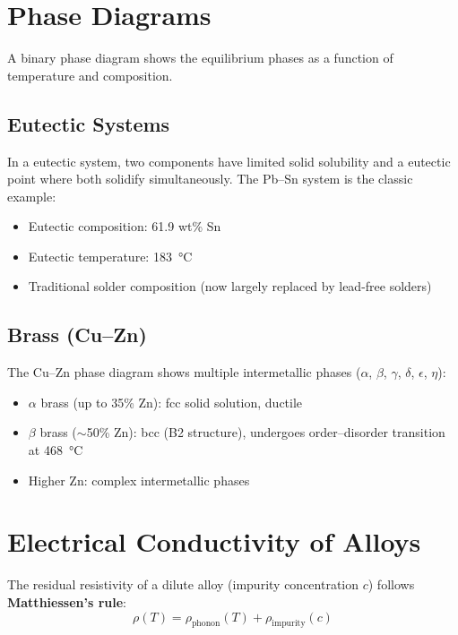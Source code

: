 \section{Phase Diagrams}

A binary phase diagram shows the equilibrium phases as a function of temperature and composition.

\subsection{Eutectic Systems}

In a eutectic system, two components have limited solid solubility and a eutectic point where both solidify simultaneously. The Pb--Sn system is the classic example:
\begin{itemize}[nosep]
  \item Eutectic composition: 61.9 wt\% Sn
  \item Eutectic temperature: \SI{183}{\celsius}
  \item Traditional solder composition (now largely replaced by lead-free solders)
\end{itemize}

\subsection{Brass (Cu--Zn)}

The Cu--Zn phase diagram shows multiple intermetallic phases ($\alpha$, $\beta$, $\gamma$, $\delta$, $\epsilon$, $\eta$):
\begin{itemize}[nosep]
  \item $\alpha$ brass (up to 35\% Zn): fcc solid solution, ductile
  \item $\beta$ brass ($\sim$50\% Zn): bcc (B2 structure), undergoes order--disorder transition at \SI{468}{\celsius}
  \item Higher Zn: complex intermetallic phases
\end{itemize}


\section{Electrical Conductivity of Alloys}

The residual resistivity of a dilute alloy (impurity concentration $c$) follows \textbf{Matthiessen's rule}:
\begin{equation}
  \rho(T) = \rho_{\text{phonon}}(T) + \rho_{\text{impurity}}(c)
\end{equation}

